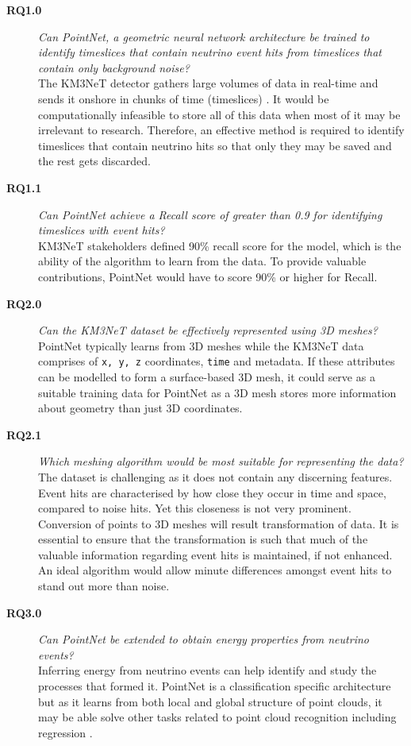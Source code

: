 \begin{description}
    \item[\textbf{RQ1.0}] \textit{Can PointNet, a geometric neural network architecture be trained to identify timeslices that contain neutrino event hits from timeslices that contain only background noise?} \\
    The KM3NeT detector gathers large volumes of data in real-time and sends it onshore in chunks of time (timeslices) \cite{km3net_2017}. It would be computationally infeasible to store all of this data when most of it may be irrelevant to research. Therefore, an effective method is required to identify timeslices that contain neutrino hits so that only they may be saved and the rest gets discarded. 
    
    \item[\textbf{RQ1.1}] \textit{Can PointNet achieve a Recall score of greater than 0.9 for identifying timeslices with event hits?} \\
    KM3NeT stakeholders defined 90\% recall score for the model, which is the ability of the algorithm to learn from the data. To provide valuable contributions, PointNet would have to score 90\% or higher for Recall.
    
    \item[\textbf{RQ2.0}] \textit{Can the KM3NeT dataset be effectively represented using 3D meshes?} \\
    PointNet typically learns from 3D meshes while the KM3NeT data comprises of \texttt{x, y, z} coordinates, \texttt{time} and metadata. If these attributes can be modelled to form a surface-based 3D mesh, it could serve as a suitable training data for PointNet as a 3D mesh stores more information about geometry than just 3D coordinates.
    
    \item[\textbf{RQ2.1}] \textit{Which meshing algorithm would be most suitable for representing the data?}  \\
    The dataset is challenging as it does not contain any discerning features. Event hits are characterised by how close they occur in time and space, compared to noise hits. Yet this closeness is not very prominent. Conversion of points to 3D meshes will result transformation of data. It is essential to ensure that the transformation is such that much of the valuable information regarding event hits is maintained, if not enhanced. An ideal algorithm would allow minute differences amongst event hits to stand out more than noise.
  
    \item[\textbf{RQ3.0}] \textit{Can PointNet be extended to obtain energy properties from neutrino events?} \\
    Inferring energy from neutrino events can help identify and study the processes that formed it. PointNet is a classification specific architecture but as it learns from both local and global structure of point clouds, it may be able solve other tasks related to point cloud recognition including regression \cite{qi2017pointnet}.
\end{description}


